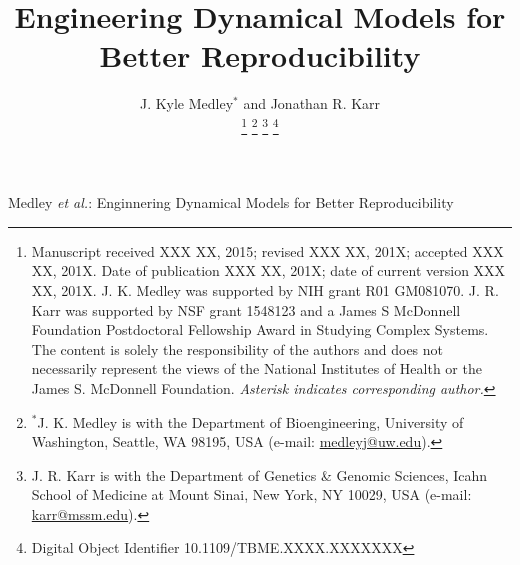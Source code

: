 \documentclass[journal,transmag,twoside]{IEEEtran}
\newcommand{\email}[1]{\href{mailto:#1}{#1}}
\begin{document}
\title{Engineering Dynamical Models for Better Reproducibility}

\author{
    J. Kyle Medley$^*$ and
	Jonathan R. Karr
    
    \thanks{
        Manuscript received XXX XX, 2015; revised XXX XX, 201X; accepted XXX XX, 201X. Date of publication XXX XX, 201X; date of current version XXX XX, 201X.
        J. K. Medley was supported by NIH grant R01 GM081070. J. R. Karr was supported by NSF grant 1548123 and a James S McDonnell Foundation Postdoctoral Fellowship Award in Studying Complex Systems. The content is solely the responsibility of the authors and does not necessarily represent the views of the National Institutes of Health or the James S. McDonnell Foundation.
        \textit{Asterisk indicates corresponding author.}
    }
    \thanks{$^*$J. K. Medley is with the Department of Bioengineering, University of Washington, Seattle, WA 98195, USA (e-mail: \email{medleyj@uw.edu}).}
    \thanks{J. R. Karr is with the Department of Genetics \& Genomic Sciences, Icahn School of Medicine at Mount Sinai, New York, NY 10029, USA (e-mail: \email{karr@mssm.edu}).}
    \thanks{Digital Object Identifier 10.1109/TBME.XXXX.XXXXXXX}
}

%
{Medley \MakeLowercase{\textit{et al.}}: Enginnering Dynamical Models for Better Reproducibility}
% 








\maketitle
\end{document}
